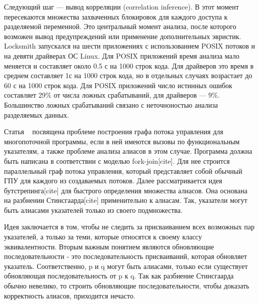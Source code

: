 Следующий шаг — вывод корреляции (correlation inference). В этот момент пересекаются множества захваченных блокировок для каждого доступа к разделяемой переменной.
Это центральный момент анализа, после которого возможен вывод предупреждений или применение дополнительных эвристик.
Locksmith запускался на шести приложениях с использованием POSIX потоков и на девяти драйверах ОС Linux.
Для POSIX приложений время анализа мало меняется и составляет около 0.5 с на 1000 строк кода.
Для драйверов это время в среднем составляет 1с на 1000 строк кода, но в отдельных случаях возрастает до 60 с на 1000 строк кода.
Для POSIX приложений число истинных ошибок составляет 29\% от числа ложных срабатываний, для драйверов — 9\%.
Большинство ложных срабатываний связано с неточноностью анализа разделяемых данных.

Статья ~\cite{Kahlon:2009:SDR} посвящена проблеме построения графа потока управления для многопоточной программы, если в ней имеются вызовы по функциональным указателям, а также проблеме анализа алиасов в этом случае. 
Программа должна быть написана в соответствии с моделью fork-join[cite]. Для нее строится параллельный граф потока управления, который представляет собой обычный ГПУ для каждого из создаваемых потоков. 
Далее рассматривается идея бутстрепинга[cite] для быстрого определения множества алиасов.
Она основана на разбиении Стинсгаарда[cite] применительно к алиасам. Так, указатели могут быть алиасами указателей только из своего подмножества.

Идея заключается в том, чтобы не следить за присваиванием всех возможных пар указателей, а только за теми, которые относятся к своему классу эквивалентности.
Вторым важным понятием являются обновляющие последовательности - это последовательность присваиваний, которая обновляет указатель.
Соответственно, p и q могут быть алиасами, только если существует обновляющая последовательность от p к q.
Так как разбиение Стинсгаарда обычно невелико, то строить обновляющие последовательности, чтобы доказать корректность алиасов, приходится нечасто. 

